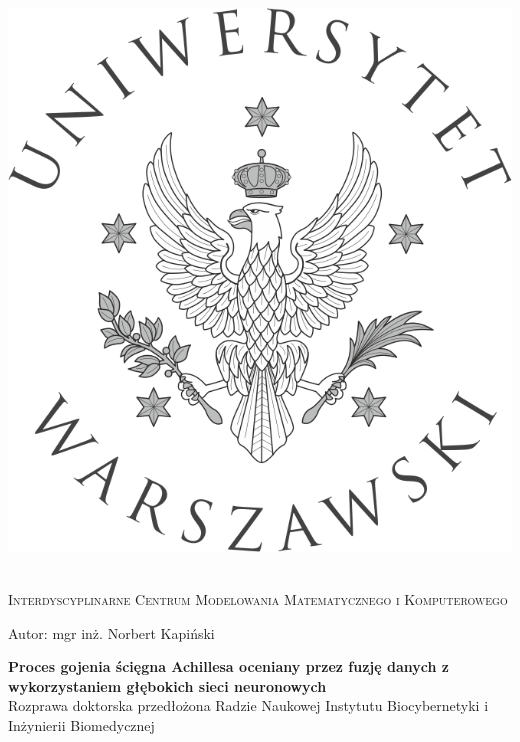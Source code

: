 
\newpage
\thispagestyle{empty}



\begin{onehalfspacing}
\begin{center}

\centering
\includegraphics[keepaspectratio,scale=0.9]{./figures/Logo-UW.jpg} \\[.5cm]


{\fontsize{17}{17}\selectfont
\textsc{ \\[.3cm]
Interdyscyplinarne Centrum Modelowania Matematycznego i Komputerowego  \\[0.5cm]
}

\large
{Autor: mgr inż. Norbert Kapiński  \\[1.7cm]}


\textbf 
{Proces gojenia ścięgna Achillesa oceniany przez fuzję danych z wykorzystaniem głębokich sieci neuronowych} \\[2.3cm]
\large
{Rozprawa doktorska przedłożona Radzie Naukowej Instytutu Biocybernetyki i Inżynierii Biomedycznej \\[1.7cm]}}





\end{center}
\end{onehalfspacing}
